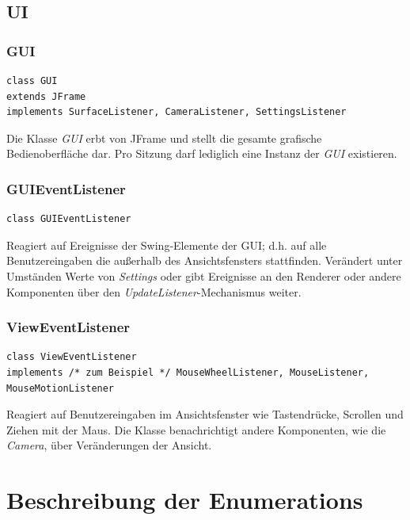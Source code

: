 \documentclass[10pt]{scrreprt}
\begin{document}
\vspace{5mm}
\section{UI}
\subsection*{GUI}
\begin{lstlisting}
class GUI
extends JFrame
implements SurfaceListener, CameraListener, SettingsListener
\end{lstlisting}
Die Klasse \textit{GUI} erbt von JFrame und stellt die gesamte grafische Bedienoberfläche dar. Pro Sitzung darf lediglich eine Instanz der \textit{GUI} existieren.\\

\vspace{5mm}
\subsection*{GUIEventListener}
\begin{lstlisting}
class GUIEventListener
\end{lstlisting}
Reagiert auf Ereignisse der Swing-Elemente der GUI; d.h. auf alle Benutzereingaben die außerhalb des Ansichtsfensters stattfinden. Verändert unter Umständen Werte von \textit{Settings} oder gibt Ereignisse an den Renderer oder andere Komponenten über den \textit{UpdateListener}-Mechanismus weiter.\\

\vspace{5mm}
\subsection*{ViewEventListener}
\begin{lstlisting}
class ViewEventListener
implements /* zum Beispiel */ MouseWheelListener, MouseListener, MouseMotionListener
\end{lstlisting}
Reagiert auf Benutzereingaben im Ansichtsfenster wie Tastendrücke, Scrollen und Ziehen mit der Maus. Die Klasse benachrichtigt andere Komponenten, wie die \textit{Camera}, über Veränderungen der Ansicht.\\




\chapter{Beschreibung der Enumerations}
\end{document}
